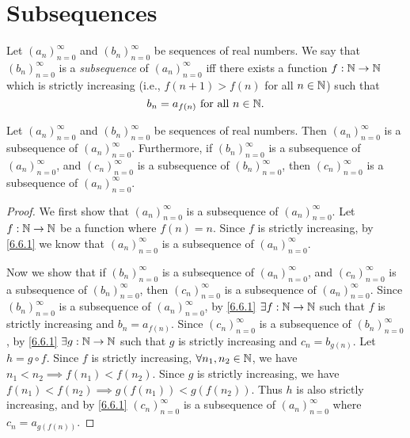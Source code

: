 \section{Subsequences}\label{sec:6.6}

\begin{defn}[Subsequences]\label{6.6.1}
  Let \((a_n)_{n = 0}^\infty\) and \((b_n)_{n = 0}^\infty\) be sequences of real numbers.
  We say that \((b_n)_{n = 0}^\infty\) is a \emph{subsequence} of \((a_n)_{n = 0}^\infty\) iff there exists a function \(f : \mathbb{N} \to \mathbb{N}\) which is strictly increasing (i.e., \(f(n + 1) > f(n)\) for all \(n \in \mathbb{N}\)) such that
  \[
    b_n = a_{f(n)} \text{ for all } n \in \mathbb{N}.
  \]
\end{defn}

\setcounter{thm}{3}
\begin{lem}\label{6.6.4}
  Let \((a_n)_{n = 0}^\infty\) and \((b_n)_{n = 0}^\infty\) be sequences of real numbers.
  Then \((a_n)_{n = 0}^\infty\) is a subsequence of \((a_n)_{n = 0}^\infty\).
  Furthermore, if \((b_n)_{n = 0}^\infty\) is a subsequence of \((a_n)_{n = 0}^\infty\), and \((c_n)_{n = 0}^\infty\) is a subsequence of \((b_n)_{n = 0}^\infty\), then \((c_n)_{n = 0}^\infty\) is a subsequence of \((a_n)_{n = 0}^\infty\).
\end{lem}

\begin{proof}
  We first show that \((a_n)_{n = 0}^\infty\) is a subsequence of \((a_n)_{n = 0}^\infty\).
  Let \(f : \mathbb{N} \to \mathbb{N}\) be a function where \(f(n) = n\).
  Since \(f\) is strictly increasing, by \cref{6.6.1} we know that \((a_n)_{n = 0}^\infty\) is a subsequence of \((a_n)_{n = 0}^\infty\).

  Now we show that if \((b_n)_{n = 0}^\infty\) is a subsequence of \((a_n)_{n = 0}^\infty\), and \((c_n)_{n = 0}^\infty\) is a subsequence of \((b_n)_{n = 0}^\infty\), then \((c_n)_{n = 0}^\infty\) is a subsequence of \((a_n)_{n = 0}^\infty\).
  Since \((b_n)_{n = 0}^\infty\) is a subsequence of \((a_n)_{n = 0}^\infty\), by \cref{6.6.1} \(\exists f : \mathbb{N} \to \mathbb{N}\) such that \(f\) is strictly increasing and \(b_n = a_{f(n)}\).
  Since \((c_n)_{n = 0}^\infty\) is a subsequence of \((b_n)_{n = 0}^\infty\), by \cref{6.6.1} \(\exists g : \mathbb{N} \to \mathbb{N}\) such that \(g\) is strictly increasing and \(c_n = b_{g(n)}\).
  Let \(h = g \circ f\).
  Since \(f\) is strictly increasing, \(\forall n_1, n_2 \in \mathbb{N}\), we have \(n_1 < n_2 \implies f(n_1) < f(n_2)\).
  Since \(g\) is strictly increasing, we have \(f(n_1) < f(n_2) \implies g(f(n_1)) < g(f(n_2))\).
  Thus \(h\) is also strictly increasing, and by \cref{6.6.1} \((c_n)_{n = 0}^\infty\) is a subsequence of \((a_n)_{n = 0}^\infty\) where \(c_n = a_{g(f(n))}\).
\end{proof}

